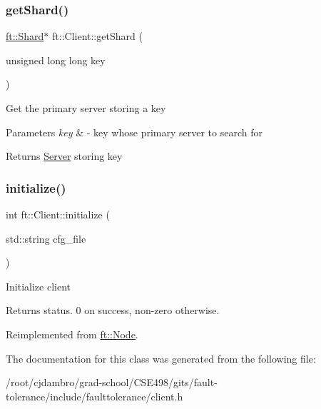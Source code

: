 \subsubsection{\texorpdfstring{get\+Shard()}{getShard()}}
{\footnotesize\ttfamily \mbox{\hyperlink{classft_1_1Shard}{ft\+::\+Shard}}$\ast$ ft\+::\+Client\+::get\+Shard (\begin{DoxyParamCaption}\item[{unsigned long long}]{key }\end{DoxyParamCaption})}

Get the primary server storing a key


\begin{DoxyParams}{Parameters}
{\em key} & -\/ key whose primary server to search for\\
\hline
\end{DoxyParams}
\begin{DoxyReturn}{Returns}
\mbox{\hyperlink{classft_1_1Server}{Server}} storing key 
\end{DoxyReturn}
\mbox{\label{classft_1_1Client_a063db70469c9f2715bbad637d0353680}} 
\subsubsection{\texorpdfstring{initialize()}{initialize()}}
{\footnotesize\ttfamily int ft\+::\+Client\+::initialize (\begin{DoxyParamCaption}\item[{std\+::string}]{cfg\+\_\+file }\end{DoxyParamCaption})\hspace{0.3cm}{\ttfamily [virtual]}}

Initialize client

\begin{DoxyReturn}{Returns}
status. 0 on success, non-\/zero otherwise. 
\end{DoxyReturn}


Reimplemented from \mbox{\hyperlink{classft_1_1Node_addc92fd2c5cae12a8ea68c30b7202e91}{ft\+::\+Node}}.



The documentation for this class was generated from the following file\+:\begin{DoxyCompactItemize}
\item 
/root/cjdambro/grad-\/school/\+C\+S\+E498/gits/fault-\/tolerance/include/faulttolerance/client.\+h\end{DoxyCompactItemize}
